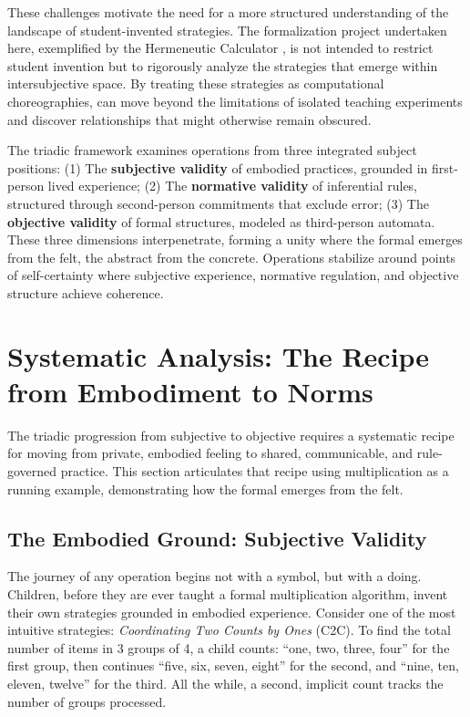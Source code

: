 \documentclass[12pt]{book}
\begin{document}
These challenges motivate the need for a more structured understanding of the landscape of student-invented strategies. The formalization project undertaken here, exemplified by the Hermeneutic Calculator \parencite{savich_hermeneutic_nodate}, is not intended to restrict student invention but to rigorously analyze the strategies that emerge within intersubjective space. By treating these strategies as computational choreographies,  can move beyond the limitations of isolated teaching experiments and discover relationships that might otherwise remain obscured.

The triadic framework examines operations from three integrated subject positions: (1) The \textbf{subjective validity} of embodied practices, grounded in first-person lived experience; (2) The \textbf{normative validity} of inferential rules, structured through second-person commitments that exclude error; (3) The \textbf{objective validity} of formal structures, modeled as third-person automata. These three dimensions interpenetrate, forming a unity where the formal emerges from the felt, the abstract from the concrete. Operations stabilize around points of self-certainty where subjective experience, normative regulation, and objective structure achieve coherence.
\section{Systematic Analysis: The Recipe from Embodiment to Norms}

The triadic progression from subjective to objective requires a systematic recipe for moving from private, embodied feeling to shared, communicable, and rule-governed practice. This section articulates that recipe using multiplication as a running example, demonstrating how the formal emerges from the felt.

\subsection*{The Embodied Ground: Subjective Validity}

The journey of any operation begins not with a symbol, but with a doing. Children, before they are ever taught a formal multiplication algorithm, invent their own strategies grounded in embodied experience. Consider one of the most intuitive strategies: \textit{Coordinating Two Counts by Ones} (C2C). To find the total number of items in 3 groups of 4, a child counts: \enquote{one, two, three, four} for the first group, then continues \enquote{five, six, seven, eight} for the second, and \enquote{nine, ten, eleven, twelve} for the third. All the while, a second, implicit count tracks the number of groups processed.
\end{document}
